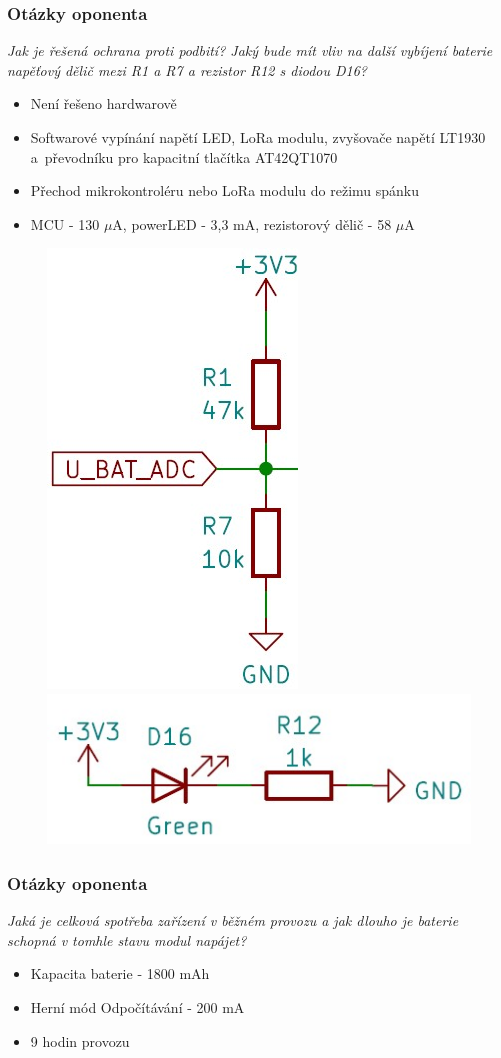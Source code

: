 \documentclass[%
  12pt,       				%
	t,                  %
	aspectratio=1610,   %
	unicode,						%
]{beamer}				    	%
\begin{document}
\begin{frame} 
	\frametitle{Otázky oponenta}
	\emph{Jak je řešená ochrana proti podbití? Jaký bude mít vliv na další vybíjení baterie napěťový dělič mezi R1 a R7 a rezistor R12 s diodou D16?}
	\begin{itemize}
		\item Není řešeno hardwarově
		\item Softwarové vypínání napětí LED, LoRa modulu, zvyšovače napětí LT1930 a~převodníku pro kapacitní tlačítka AT42QT1070 
		\item Přechod mikrokontroléru nebo LoRa modulu do režimu spánku 
		\item MCU - 130 $\mu$A, powerLED - 3,3 mA, rezistorový dělič - 58 $\mu$A 
	\end{itemize}

	\begin{figure}
		\includegraphics[width=0.13\columnwidth]{obrazky/dotaz_delic.jpg}
		\includegraphics[width=0.28\columnwidth]{obrazky/dotaz_power_LED.jpg}
	\end{figure}
	
\end{frame}

\begin{frame} 
	\frametitle{Otázky oponenta}
	\emph{Jaká je celková spotřeba zařízení v běžném provozu a jak dlouho je baterie schopná v tomhle stavu modul napájet?}
	\begin{itemize}
		\item Kapacita baterie - 1800 mAh
		\item Herní mód Odpočítávání - 200 mA 
		\item 9 hodin provozu 
	\end{itemize}
\end{frame}
\end{document}
